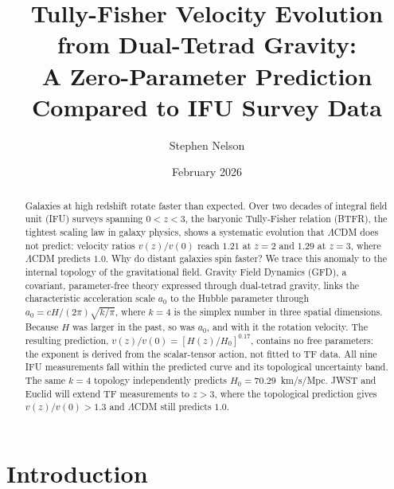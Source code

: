 \documentclass[aps,prd,preprint,superscriptaddress,showpacs,preprintnumbers,amsmath,amssymb,nofootinbib]{revtex4-2}
\begin{document}
\title{Tully-Fisher Velocity Evolution from Dual-Tetrad Gravity:\\
A Zero-Parameter Prediction Compared to IFU Survey Data}

\author{Stephen Nelson}

\date{February 2026}

\begin{abstract}
Galaxies at high redshift rotate faster than expected. Over two decades of integral field unit (IFU) surveys spanning $0 < z < 3$, the baryonic Tully-Fisher relation (BTFR), the tightest scaling law in galaxy physics, shows a systematic evolution that $\Lambda$CDM does not predict: velocity ratios $v(z)/v(0)$ reach $1.21$ at $z = 2$ and $1.29$ at $z = 3$, where $\Lambda$CDM predicts $1.0$. Why do distant galaxies spin faster? We trace this anomaly to the internal topology of the gravitational field. Gravity Field Dynamics (GFD), a covariant, parameter-free theory expressed through dual-tetrad gravity, links the characteristic acceleration scale $a_0$ to the Hubble parameter through $a_0 = cH/(2\pi)\sqrt{k/\pi}$, where $k = 4$ is the simplex number in three spatial dimensions. Because $H$ was larger in the past, so was $a_0$, and with it the rotation velocity. The resulting prediction, $v(z)/v(0) = [H(z)/H_0]^{0.17}$, contains no free parameters: the exponent is derived from the scalar-tensor action, not fitted to TF data. All nine IFU measurements fall within the predicted curve and its topological uncertainty band. The same $k = 4$ topology independently predicts $H_0 = 70.29$~km/s/Mpc. JWST and Euclid will extend TF measurements to $z > 3$, where the topological prediction gives $v(z)/v(0) > 1.3$ and $\Lambda$CDM still predicts $1.0$.
\end{abstract}


\section{Introduction}
\label{sec:intro}
\end{document}
